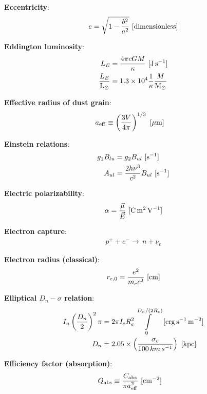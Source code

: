 \documentclass[a4paper,10pt]{article}
\begin{document}
{\noindent}\textbf{Eccentricity}:
\begin{align*}
    e = \sqrt{1-\frac{b^2}{a^2}} ~ [{\rm dimensionless}]
\end{align*}

{\noindent}\textbf{Eddington luminosity}:
\begin{align*}
    L_E &= \frac{4\pi cGM}{\kappa} ~ [{\rm J\,s^{-1}}] \\
    \frac{L_E}{{\rm L_\odot}} &= 1.3\times10^4\frac{1}{\kappa} \frac{M}{{\rm M_\odot}}
\end{align*}

{\noindent}\textbf{Effective radius of dust grain}:
\begin{align*}
    a_{\rm eff} &\equiv \left(\frac{3V}{4\pi}\right)^{1/3}  ~ [{\rm \mu m}]
\end{align*}

{\noindent}\textbf{Einstein relations}:
\begin{align*}
    g_1B_{lu} &= g_2B_{ul} ~ [{\rm s^{-1}}] \\
    A_{ul}    &= \frac{2h\nu^3}{c^2}B_{ul}  ~ [{\rm s^{-1}}]
\end{align*}

{\noindent}\textbf{Electric polarizability}:
\begin{align*}
    \alpha = \frac{\vec{\mu}}{\vec{E}} ~ [{\rm C\,m^2\,V^{-1}}]
\end{align*}

{\noindent}\textbf{Electron capture}:
\begin{align*}
    p^+ +e^- \rightarrow\,n + \nu_e
\end{align*}

{\noindent}\textbf{Electron radius (classical)}:
\begin{align*}
    r_{e,0} = \frac{e^2}{m_ec^2} ~ [{\rm cm}]
\end{align*}

{\noindent}\textbf{Elliptical $D_n-\sigma$ relation}:
\begin{align*}
    I_n\left(\frac{D_n}{2}\right)^2\pi &= 2\pi I_eR_e^2 \int\limits_0^{D_n/(2R_e)} ~ [{\rm erg\,s^{-1}\,m^{-2}}] \\
    D_n &= 2.05\times\left(\frac{\sigma_v}{100\,km\,s^{-1}}\right) ~ [{\rm kpc}]
\end{align*}

{\noindent}\textbf{Efficiency factor (absorption)}:
\begin{align*}
    Q_{\rm abs} &\equiv \frac{C_{\rm abs}}{\pi a_{\rm eff}^2} ~ [{\rm cm^{-2}}]
\end{align*}
\end{document}

